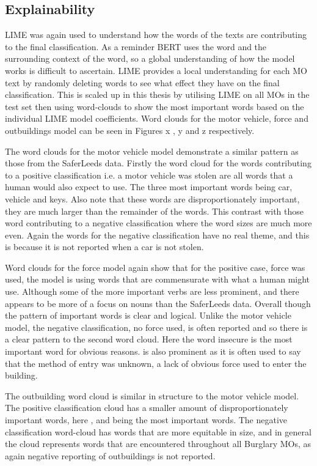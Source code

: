\subsection{Explainability} LIME was again used to understand how the words of the texts are contributing to the final classification. As a reminder BERT uses the word and the surrounding context of the word, so a global understanding of how the model works is difficult to ascertain. LIME provides a local understanding for each MO text by randomly deleting words to see what effect they have on the final classification. This is scaled up in this thesis by utilising LIME on all MOs in the test set then using word-clouds to show the most important words based on the individual LIME model coefficients. Word clouds for the motor vehicle, force and outbuildings model can be seen in Figures x , y and z respectively.

The word clouds for the motor vehicle model demonstrate a similar pattern as those from the SaferLeeds data. Firstly the word cloud for the words contributing to a positive classification i.e. a motor vehicle was stolen are all words that a human would also expect to use. The three most important words being car, vehicle and keys. Also note that these words are disproportionately important, they are much larger than the remainder of the words. This contrast with those word contributing to a negative classification where the word sizes are much more even. Again the words for the negative classification have no real theme, and this is because it is not reported when a car is not stolen.

Word clouds for the force model again show that for the positive case, force was used, the model is using words that are commensurate with what a human might use. Although some of the more important verbs are less prominent, and there appears to be more of a focus on nouns than the SaferLeeds data. Overall though the pattern of important words is clear and logical. Unlike the motor vehicle model, the negative classification, no force used, is often reported and so there is a clear pattern to the second word cloud. Here the word insecure is the most important word for obvious reasons.  is also prominent as it is often used to say that the method of entry was unknown, a lack of obvious force used to enter the building. 

The outbuilding word cloud is similar in structure to the motor vehicle model. The positive classification cloud has a smaller amount of disproportionately important words, here ,  and  being the most important words. The negative classification word-cloud has words that are more equitable in size, and in general the cloud represents words that are encountered throughout all Burglary MOs, as again negative reporting of outbuildings is not reported. 

